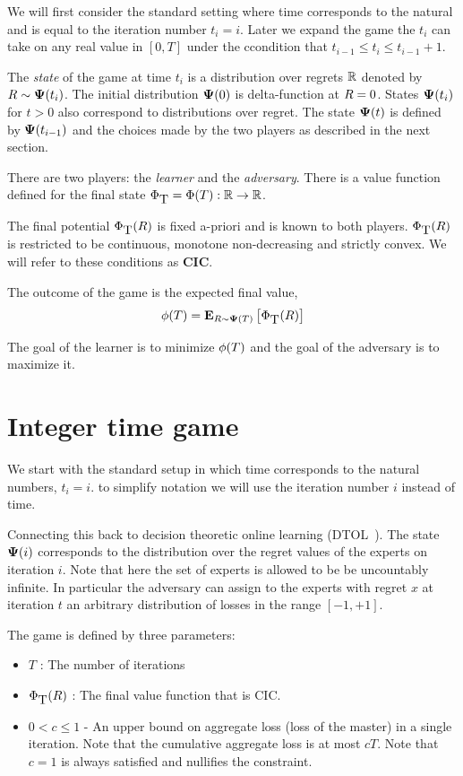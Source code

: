 \documentclass{article}[12pt]
\begin{document}
We will first consider the standard setting where time corresponds to
the natural and is equal to the iteration number $t_i=i$. Later we
expand the game the $t_i$ can take on any real value in $[0,T]$ under
the ccondition that $t_{i-1} \leq t_i \leq t_{i-1}+1$.

The {\em state} of the game at time $t_i$ is a distribution over regrets 
$\mathbb{R}$ denoted by $R \sim {\bf \Psi}(t_i)$. The initial distribution ${\bf \Psi}(0)$
is delta-function at $R=0$. States ${\bf \Psi}(t_i)$ for $t>0$ also
correspond to distributions over regret.
The state ${\bf \Psi}(t)$ is defined by ${\bf \Psi}(t_{i-1})$ and the choices made
by the two players as described in the next section.

There are two players: the {\em learner} and the {\em adversary}. There is a
value function defined for the final state
$\Phi_{\mbox{T}} = \Phi(T):\mathbb{R} \to \mathbb{R}$.

The final potential $\Phi_{\mbox{T}}(R)$ is fixed a-priori and is known to
both players. $\Phi_{\mbox{T}}(R)$ is restricted to be  continuous, monotone
non-decreasing and strictly convex. We will refer to these conditions
as {\bf CIC}.

The outcome of the game is the expected final value,
\begin{equation} \label{eqn:FinalExpectedValue}
  \phi(T) ={\bf E}_{R \sim {\bf \Psi}(T)}\left[ \Phi_{\mbox{T}}(R) \right]
\end{equation}

The goal of the learner is to minimize $\phi(T)$ and the goal of
the adversary is to maximize it.

\section{Integer time game}
We start with the standard setup in which time corresponds to the
natural numbers, $t_i=i$. to simplify notation we will use the
iteration number $i$ instead of time.

Connecting this back to decision theoretic online learning
(DTOL~\cite{}). The state ${\bf \Psi}(i)$ corresponds to the distribution
over the regret values of the experts on iteration $i$. Note that here the set of
experts is allowed to be be uncountably infinite. In particular the
adversary can assign to the experts with regret $x$ at iteration $t$
an arbitrary distribution of losses in the range $[-1,+1]$.

The game is defined by three parameters:
\begin{itemize}
\item $T$ : The number of iterations
\item $\Phi_{\mbox{T}}(R)$ : The final value function that is CIC.
\item $0<c \leq 1$ - An upper bound on aggregate loss (loss of the master)
  in a single iteration. Note that the cumulative aggregate loss is at
  most $cT$. Note that $c=1$ is always satisfied and nullifies the
  constraint.
\end{itemize}
\end{document}
